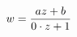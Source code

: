 \documentclass[preview]{standalone}
\begin{document}
\centering
\begin{align*}
w=\frac{{{{\color[RGB]{0, 0, 3}{{\color[RGB]{0, 0, 1}{a}}}z+{{\color[RGB]{0, 0, 2}{b}}}}}}}{0\cdot z+1}
\end{align*}
\end{document}
